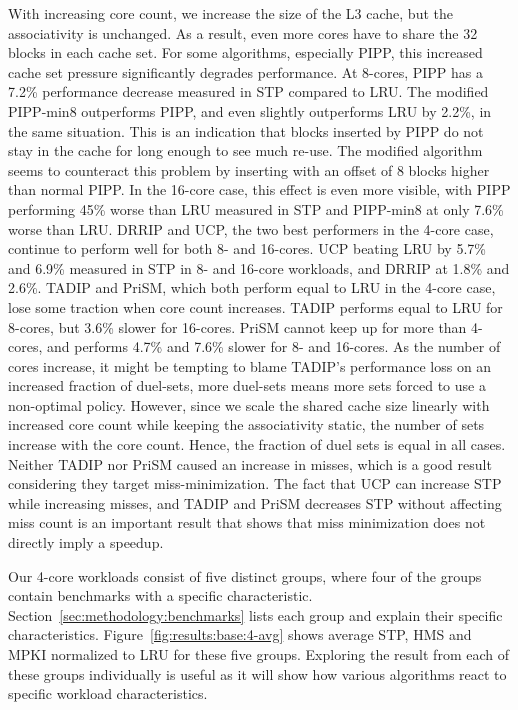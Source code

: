 With increasing core count, we increase the size of the L3 cache, but the associativity is unchanged.
As a result, even more cores have to share the 32 blocks in each cache set.
For some algorithms, especially PIPP, this increased cache set pressure significantly degrades performance.
At 8-cores, PIPP has a 7.2\% performance decrease measured in STP compared to LRU.
The modified PIPP-min8 outperforms PIPP, and even slightly outperforms LRU by 2.2\%, in the same situation.
This is an indication that blocks inserted by PIPP do not stay in the cache for long enough to see much re-use.
The modified algorithm seems to counteract this problem by inserting with an offset of 8 blocks higher than normal PIPP.
In the 16-core case, this effect is even more visible, with PIPP performing 45\% worse than LRU measured in STP and PIPP-min8 at only 7.6\% worse than LRU.
DRRIP and UCP, the two best performers in the 4-core case, continue to perform well for both 8- and 16-cores.
UCP beating LRU by 5.7\% and 6.9\% measured in STP in 8- and 16-core workloads, and DRRIP at 1.8\% and 2.6\%.
TADIP and PriSM, which both perform equal to LRU in the 4-core case, lose some traction when core count increases.
TADIP performs equal to LRU for 8-cores, but 3.6\% slower for 16-cores.
PriSM cannot keep up for more than 4-cores, and performs 4.7\% and 7.6\% slower for 8- and 16-cores.
As the number of cores increase, it might be tempting to blame TADIP's performance loss on an increased fraction of duel-sets, more duel-sets means more sets forced to use a non-optimal policy.
However, since we scale the shared cache size linearly with increased core count while keeping the associativity static, the number of sets increase with the core count.
Hence, the fraction of duel sets is equal in all cases.
Neither TADIP nor PriSM caused an increase in misses, which is a good result considering they target miss-minimization.
The fact that UCP can increase STP while increasing misses, and TADIP and PriSM decreases STP without affecting miss count is an important result that shows that miss minimization does not directly imply a speedup.

Our 4-core workloads consist of five distinct groups, where four of the groups contain benchmarks with a specific characteristic.
Section~\ref{sec:methodology:benchmarks} lists each group and explain their specific characteristics.
Figure~\ref{fig:results:base:4-avg} shows average STP, HMS and MPKI normalized to LRU for these five groups.
Exploring the result from each of these groups individually is useful as it will show how various algorithms react to specific workload characteristics.

